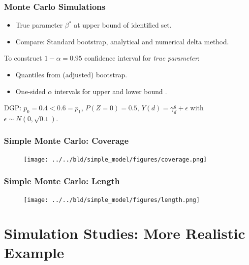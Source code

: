 \documentclass[11pt, aspectratio=169]{beamer}
\begin{document}
\begin{frame}
    \frametitle{Monte Carlo Simulations}

    \begin{itemize}
        \item True parameter $\beta^*$ at upper bound of identified set.
        \item Compare: Standard bootstrap, analytical and numerical delta method.
    \end{itemize}

    \vspace{0.5cm}

    To construct $1-\alpha = 0.95$ confidence interval for \textit{true parameter}:
    \begin{itemize}
        \item Quantiles from (adjusted) bootstrap.
        \item One-sided $\alpha$ intervals for upper and lower bound \citep{imbens2004confidence}.
    \end{itemize}

    \vspace{0.5cm}

    DGP\@: $p_0 = 0.4 < 0.6 = p_1$, $P(Z=0)=0.5$, $Y(d) = \gamma_d^g + \epsilon$ with $\epsilon\sim N(0, \sqrt{0.1})$.


\end{frame}

\begin{frame}
    \frametitle{Simple Monte Carlo: Coverage}

    \begin{figure}
        \texttt{[image: ../../bld/simple\_model/figures/coverage.png]}
    \end{figure}

\end{frame}

\begin{frame}
    \frametitle{Simple Monte Carlo: Length}

    \begin{figure}
        \texttt{[image: ../../bld/simple\_model/figures/length.png]}
    \end{figure}

\end{frame}

\section{Simulation Studies: More Realistic Example}
\end{document}
